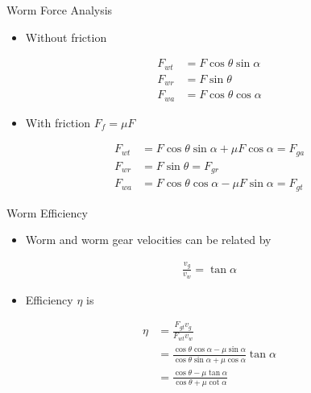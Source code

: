 \documentclass[
10pt,
a4paper,
openany,
svgnames,
]{book}
\begin{document}
\begin{frame}{Worm Force Analysis}
      \begin{figure}[htbp]
        \centering
      \end{figure}
      \begin{itemize}
        \item Without friction
      \end{itemize}
      \begin{align*}
        F_{wt} &= F \cos \theta \sin \alpha \\
        F_{wr} &= F \sin \theta \\
        F_{wa} &= F \cos \theta \cos \alpha
      \end{align*}
      \begin{itemize}
        \item With friction $F_{f} = \mu F$
      \end{itemize}
      \begin{align*}
        F_{wt} &= F \cos \theta \sin \alpha + \mu F \cos \alpha = F_{ga} \\
        F_{wr} &= F \sin \theta = F_{gr} \\
        F_{wa} &= F \cos \theta \cos \alpha - \mu F \sin \alpha = F_{gt}
      \end{align*}
\end{frame}

\begin{frame}{Worm Efficiency}
  \begin{itemize}
    \item Worm and worm gear velocities can be related by
  \end{itemize}
  \begin{align*}
    \frac{v_{g}}{v_{w}} = \tan \alpha
  \end{align*}
  \begin{itemize}
    \item Efficiency $\eta$ is
  \end{itemize}
  \begin{align*}
    \eta &= \frac{F_{gt}v_{g}}{F_{wt}v_{w}} \\
         &= \frac{\cos \theta \cos \alpha - \mu \sin \alpha}{\cos \theta \sin \alpha + \mu \cos \alpha} \tan \alpha \\
         &= \frac{\cos \theta - \mu \tan \alpha}{\cos \theta + \mu \cot \alpha}
  \end{align*}
\end{frame}
\end{document}
